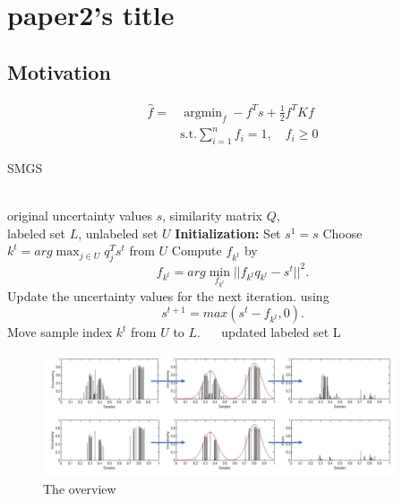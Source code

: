 \renewcommand{\algorithmicrequire}{\textbf{Input:}}
\renewcommand{\algorithmicensure}{\textbf{Output:}} 

\section{paper2's title}

\subsection{Motivation}

\begin{equation}
\begin{aligned} 
    \widehat{f} = & \operatorname{argmin}_{f} - f^{T} s + \frac{1}{2} f^{T} K f \\ 
    &\text{s.t.}\sum_{i=1}^{n}f_{i}=1,\quad f_{i}\geq0
\end{aligned}
\label{equ:max_div}
\end{equation}

\begin{algorithm}
\caption{SMGS}
\label{alg:gs}
\begin{algorithmic}
    \REQUIRE ~~\\
    original uncertainty values $s$, similarity matrix $Q$, \\
    labeled set $L$, unlabeled set $U$
    \STATE \textbf{Initialization:} Set $s^1 = s$
        \STATE Choose $k^t = arg \max_{j\in U} q^T_j s^t$ from $U$
        \STATE Compute $f_{k^t}$ by $$ f_{k^t} = arg \min_{f_{k^t}} ||f_{k^t} q_{k^t} - s^t||^2.$$
        \STATE Update the uncertainty values for the next iteration.
        \STATE using $$s^{t+1} = max(s^t - f_{k^t}, 0).$$
        \STATE Move sample index $k^t$ from $U$ to $L$.
    \ENDFOR
    \ENSURE ~~ updated labeled set L
\end{algorithmic}
    \label{code:SMGS}
\end{algorithm}



\begin{figure}[ht!]
    \centering
    \includegraphics[width=10.4cm]{sparse_selective.png}
    \caption{The overview}
    \label{sparse_time}
\end{figure}

